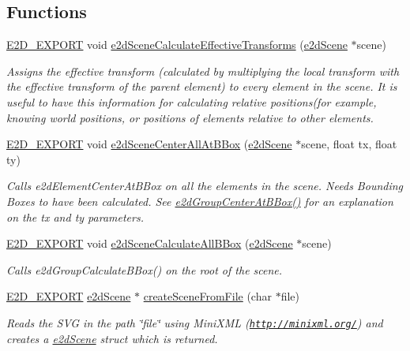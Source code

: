 \subsection*{Functions}
\begin{DoxyCompactItemize}
\item 
\hyperlink{Ez2DS_8h_a9f14e9cb869e1a85fdaba03afcca0df9}{E2\-D\-\_\-\-E\-X\-P\-O\-R\-T} void \hyperlink{group__e2dScene_ga6981f2448904c96723449cb84ffb4d8a}{e2d\-Scene\-Calculate\-Effective\-Transforms} (\hyperlink{structe2dScene}{e2d\-Scene} $\ast$scene)
\begin{DoxyCompactList}\small\item\em Assigns the effective transform (calculated by multiplying the local transform with the effective transform of the parent element) to every element in the scene. It is useful to have this information for calculating relative positions(for example, knowing world positions, or positions of elements relative to other elements. \end{DoxyCompactList}\item 
\hyperlink{Ez2DS_8h_a9f14e9cb869e1a85fdaba03afcca0df9}{E2\-D\-\_\-\-E\-X\-P\-O\-R\-T} void \hyperlink{group__e2dScene_ga1d33ba7ce041a68b061cfa6b0291b886}{e2d\-Scene\-Center\-All\-At\-B\-Box} (\hyperlink{structe2dScene}{e2d\-Scene} $\ast$scene, float tx, float ty)
\begin{DoxyCompactList}\small\item\em Calls e2d\-Element\-Center\-At\-B\-Box on all the elements in the scene. Needs Bounding Boxes to have been calculated. See \hyperlink{group__e2dGroup_ga2800a7dc3827e8753e2f2c6ef2e05eb9}{e2d\-Group\-Center\-At\-B\-Box()} for an explanation on the tx and ty parameters. \end{DoxyCompactList}\item 
\hyperlink{Ez2DS_8h_a9f14e9cb869e1a85fdaba03afcca0df9}{E2\-D\-\_\-\-E\-X\-P\-O\-R\-T} void \hyperlink{group__e2dScene_gaa202610ee0b2e5c47bded576b365c195}{e2d\-Scene\-Calculate\-All\-B\-Box} (\hyperlink{structe2dScene}{e2d\-Scene} $\ast$scene)
\begin{DoxyCompactList}\small\item\em Calls e2d\-Group\-Calculate\-B\-Box() on the root of the scene. \end{DoxyCompactList}\item 
\hyperlink{Ez2DS_8h_a9f14e9cb869e1a85fdaba03afcca0df9}{E2\-D\-\_\-\-E\-X\-P\-O\-R\-T} \hyperlink{structe2dScene}{e2d\-Scene} $\ast$ \hyperlink{group__e2dScene_ga9994e9f2692c5007b91d02c19350cd1b}{create\-Scene\-From\-File} (char $\ast$file)
\begin{DoxyCompactList}\small\item\em Reads the S\-V\-G in the path \char`\"{}file\char`\"{} using Mini\-X\-M\-L (\href{http://minixml.org/}{\tt http\-://minixml.\-org/}) and creates a \hyperlink{structe2dScene}{e2d\-Scene} struct which is returned. \end{DoxyCompactList}\end{DoxyCompactItemize}


